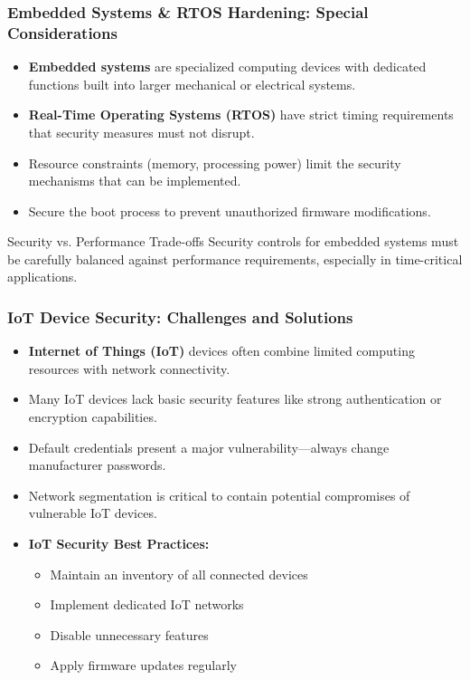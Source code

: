 \documentclass{beamer}
\begin{document}
\begin{frame}
    \frametitle{Embedded Systems \& RTOS Hardening: Special Considerations}
    
    \begin{itemize}
        \item \textbf{Embedded systems} are specialized computing devices with dedicated functions built into larger mechanical or electrical systems.
        \item \textbf{Real-Time Operating Systems (RTOS)} have strict timing requirements that security measures must not disrupt.
        \item Resource constraints (memory, processing power) limit the security mechanisms that can be implemented.
        \item Secure the boot process to prevent unauthorized firmware modifications.
    \end{itemize}
    
    \begin{alertblock}{Security vs. Performance Trade-offs}
        Security controls for embedded systems must be carefully balanced against performance requirements, especially in time-critical applications.
    \end{alertblock}
\end{frame}

\begin{frame}
    \frametitle{IoT Device Security: Challenges and Solutions}
    
    \begin{itemize}
        \item \textbf{Internet of Things (IoT)} devices often combine limited computing resources with network connectivity.
        \item Many IoT devices lack basic security features like strong authentication or encryption capabilities.
        \item Default credentials present a major vulnerability—always change manufacturer passwords.
        \item Network segmentation is critical to contain potential compromises of vulnerable IoT devices.
    \end{itemize}
    
    \begin{itemize}
        \item[] \textbf{IoT Security Best Practices:}
        \begin{itemize}
            \item Maintain an inventory of all connected devices
            \item Implement dedicated IoT networks
            \item Disable unnecessary features
            \item Apply firmware updates regularly
        \end{itemize}
    \end{itemize}
\end{frame}
\end{document}
